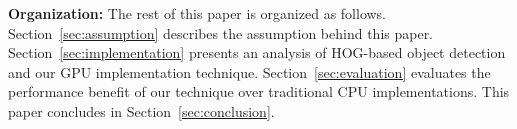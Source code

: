 \textbf{Organization:}
The rest of this paper is organized as follows.
Section~\ref{sec:assumption} describes the assumption behind this paper.
Section~\ref{sec:implementation} presents an analysis of HOG-based
object detection and our GPU implementation technique.
Section~\ref{sec:evaluation} evaluates the performance benefit of our
technique over traditional CPU implementations.
This paper concludes in Section~\ref{sec:conclusion}.